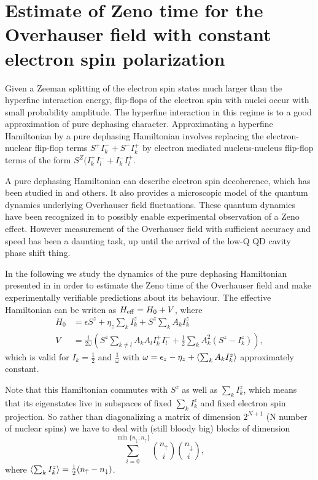 \documentclass[aps, pra, amsfonts, a4paper, showpacs]{revtex4-1}
\begin{document}
\section*{Estimate of Zeno time for the Overhauser field with constant electron spin polarization}
Given a Zeeman splitting of the electron spin states much larger than the hyperfine interaction energy, flip-flops of the electron spin with nuclei occur with small probability amplitude. The hyperfine interaction in this regime is to a good approximation of pure dephasing character. Approximating a hyperfine Hamiltonian by a pure dephasing Hamiltonian involves replacing the electron-nuclear flip-flop terms $S^+I_k^- + S^-I_k^+$ by electron mediated nucleus-nucleus flip-flop terms of the form $S^Z(I_k^+I_l^- + I_k^-I_l^+$.

A pure dephasing Hamiltonian can describe electron spin decoherence, which has been studied in \cite{cywinski_electron_2009} and others. It also provides a microscopic model of the quantum dynamics underlying Overhauser field fluctuations. These quantum dynamics have been recognized in \cite{klauser_nuclear_2008} to possibly enable experimental observation of a Zeno effect. However measurement of the Overhauser field with sufficient accuracy and speed has been a daunting task, up until the arrival of the low-Q QD cavity phase shift thing.

In the following we study the dynamics of the pure dephasing Hamiltonian presented in \cite{klauser_nuclear_2008} in order to estimate the Zeno time of the Overhauser field and make experimentally verifiable predictions about its behaviour. The effective Hamiltonian can be writen as $H_{\mathrm{eff}}=H_0 + V$, where
\begin{equation}
\begin{split}
H_0 &= \epsilon S^z + \eta_z \sum_k I_k^z + S^z \sum_k A_k I_k^z \\
V &= \frac{1}{2\omega} (S^z \sum_{k \neq l} A_k A_l I_k^+ I_l^- + \frac{1}{2}\sum_k A_k^2(S^z - I_k^z)),
\end{split}
\label{Eq: Heff}
\end{equation}
which is valid for $I_k = \frac{1}{2}$ and $\frac{1}{\omega}$ with $\omega=\epsilon_z - \eta_z + \braket{\sum_kA_kI_k^z}$ approximately constant.

Note that this Hamiltonian commutes with $S^z$ as well as $\sum_k I_k^z$, which means that its eigenstates live in subspaces of fixed $\sum_k I_k^z$ and fixed electron spin projection. So rather than diagonalizing a matrix of dimension $2^{N+1}$ (N number of nuclear spins) we have to deal with (still bloody big) blocks of dimension 
\[
\sum_{i=0}^{\min\{n_{\downarrow},n_{\uparrow}\}} \binom{n_{\uparrow}}{i}\binom{n_{\downarrow}}{i},
\]
where $\braket{\sum_kI_k^z} = \frac{1}{2}(n_{\uparrow}-n_{\downarrow})$.
\end{document}
